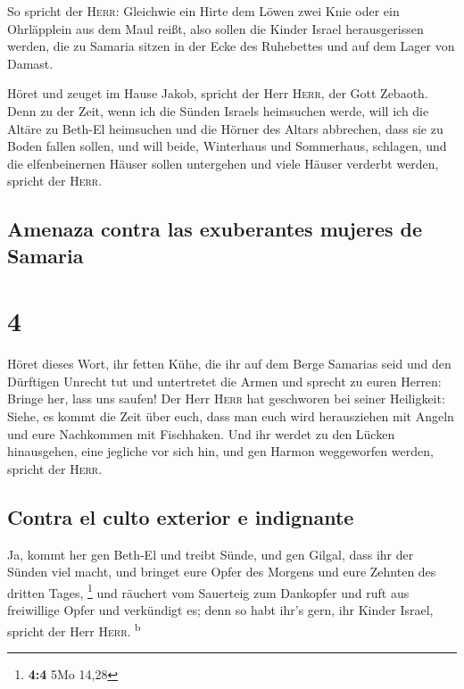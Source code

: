  So spricht der \textsc{Herr}: Gleichwie ein Hirte dem
Löwen zwei Knie oder ein Ohrläpplein aus dem Maul reißt, also sollen die
Kinder Israel herausgerissen werden, die zu Samaria sitzen in der Ecke
des Ruhebettes und auf dem Lager von Damast.

 Höret und zeuget im Hause Jakob, spricht der Herr
\textsc{Herr}, der Gott Zebaoth.  Denn zu der Zeit, wenn
ich die Sünden Israels heimsuchen werde, will ich die Altäre zu Beth-El
heimsuchen und die Hörner des Altars abbrechen, dass sie zu Boden fallen
sollen,  und will beide, Winterhaus und Sommerhaus,
schlagen, und die elfenbeinernen Häuser sollen untergehen und viele
Häuser verderbt werden, spricht der \textsc{Herr}.

\hypertarget{amenaza-contra-las-exuberantes-mujeres-de-samaria}{%
\subsection{Amenaza contra las exuberantes mujeres de
Samaria}\label{amenaza-contra-las-exuberantes-mujeres-de-samaria}}

\hypertarget{section-3}{%
\section{4}\label{section-3}}

 Höret dieses Wort, ihr fetten Kühe, die ihr auf dem Berge
Samarias seid und den Dürftigen Unrecht tut und untertretet die Armen
und sprecht zu euren Herren: Bringe her, lass uns saufen! 
Der Herr \textsc{Herr} hat geschworen bei seiner Heiligkeit: Siehe, es
kommt die Zeit über euch, dass man euch wird herausziehen mit Angeln und
eure Nachkommen mit Fischhaken.  Und ihr werdet zu den
Lücken hinausgehen, eine jegliche vor sich hin, und gen Harmon
weggeworfen werden, spricht der \textsc{Herr}.

\hypertarget{contra-el-culto-exterior-e-indignante}{%
\subsection{Contra el culto exterior e
indignante}\label{contra-el-culto-exterior-e-indignante}}

 Ja, kommt her gen Beth-El und treibt Sünde, und gen
Gilgal, dass ihr der Sünden viel macht, und bringet eure Opfer des
Morgens und eure Zehnten des dritten Tages, \footnote{\textbf{4:4} 5Mo
  14,28}  und räuchert vom Sauerteig zum Dankopfer und
ruft aus freiwillige Opfer und verkündigt es; denn so habt ihr's gern,
ihr Kinder Israel, spricht der Herr \textsc{Herr}. \textsuperscript{b}

